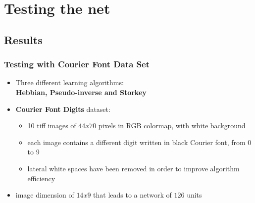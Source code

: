 \documentclass{beamer}
\begin{document}
%



\section{Testing the net}

\subsection{Results}
\begin{frame}
\frametitle{Testing with Courier Font Data Set}
\begin{itemize}
\item Three different learning algorithms:\\\textbf{Hebbian, Pseudo-inverse and Storkey}
\item \textbf{Courier Font Digits} dataset:
\begin{itemize}
\item 10 tiff images of $44x70$ pixels in RGB colormap, with white background
\item each image contains a different digit written in black Courier font, from 0 to 9
\item lateral white spaces have been removed in order to improve algorithm efficiency
\end{itemize}
\item image dimension of $14x9$ that leads to a network of $126$ units
\end{itemize}
\end{frame}
\end{document}
